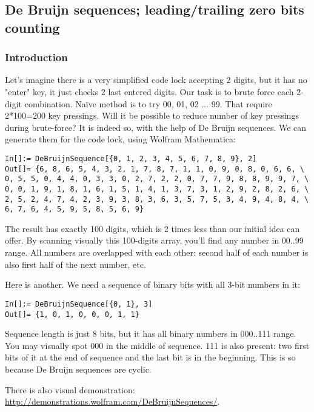 \subsection{De Bruijn sequences; leading/trailing zero bits counting}

\subsubsection{Introduction}

Let's imagine there is a very simplified code lock accepting 2 digits, but it has no "enter" key, it just checks 2 last entered digits.
Our task is to brute force each 2-digit combination.
Naïve method is to try 00, 01, 02 ... 99.
That require 2*100=200 key pressings.
Will it be possible to reduce number of key pressings during brute-force?
It is indeed so, with the help of De Bruijn sequences.
We can generate them for the code lock, using Wolfram Mathematica:

\begin{lstlisting}
In[]:= DeBruijnSequence[{0, 1, 2, 3, 4, 5, 6, 7, 8, 9}, 2]
Out[]= {6, 8, 6, 5, 4, 3, 2, 1, 7, 8, 7, 1, 1, 0, 9, 0, 8, 0, 6, 6, \
0, 5, 5, 0, 4, 4, 0, 3, 3, 0, 2, 7, 2, 2, 0, 7, 7, 9, 8, 8, 9, 9, 7, \
0, 0, 1, 9, 1, 8, 1, 6, 1, 5, 1, 4, 1, 3, 7, 3, 1, 2, 9, 2, 8, 2, 6, \
2, 5, 2, 4, 7, 4, 2, 3, 9, 3, 8, 3, 6, 3, 5, 7, 5, 3, 4, 9, 4, 8, 4, \
6, 7, 6, 4, 5, 9, 5, 8, 5, 6, 9}
\end{lstlisting}

The result has exactly 100 digits, which is 2 times less than our initial idea can offer.
By scanning visually this 100-digits array, you'll find any number in 00..99 range.
All numbers are overlapped with each other: second half of each number is also first half of the next number, etc.

Here is another. We need a sequence of binary bits with all 3-bit numbers in it:

\begin{lstlisting}
In[]:= DeBruijnSequence[{0, 1}, 3]
Out[]= {1, 0, 1, 0, 0, 0, 1, 1}
\end{lstlisting}

Sequence length is just 8 bits, but it has all binary numbers in 000..111 range.
You may visually spot 000 in the middle of sequence.
111 is also present: two first bits of it at the end of sequence and the last bit is in the beginning.
This is so because De Bruijn sequences are cyclic.

There is also visual demonstration: \url{http://demonstrations.wolfram.com/DeBruijnSequences/}.

